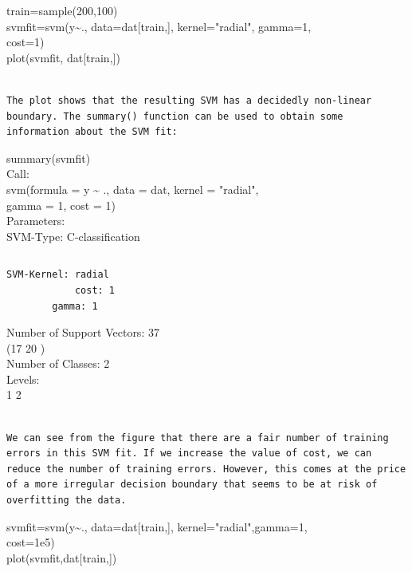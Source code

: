 \documentclass[10pt]{article}
\begin{document}
\begin{displayquote}
train=sample(200,100)\\[0pt]
svmfit=svm(y\~{}., data=dat[train,], kernel="radial", gamma=1,\\
cost=1)\\[0pt]
plot(svmfit, dat[train,])
\end{displayquote}

\begin{verbatim}

The plot shows that the resulting SVM has a decidedly non-linear boundary. The summary() function can be used to obtain some information about the SVM fit:
\end{verbatim}

\begin{displayquote}
summary(svmfit)\\
Call:\\
svm(formula = y \~{} ., data = dat, kernel = "radial",\\
gamma = 1, cost = 1)\\
Parameters:\\
SVM-Type: C-classification
\end{displayquote}

\begin{verbatim}

\end{verbatim}

\begin{verbatim}
SVM-Kernel: radial
            cost: 1
        gamma: 1
\end{verbatim}

Number of Support Vectors: 37\\
(17 20 )\\
Number of Classes: 2\\
Levels:\\
1 2

\begin{verbatim}

We can see from the figure that there are a fair number of training errors in this SVM fit. If we increase the value of cost, we can reduce the number of training errors. However, this comes at the price of a more irregular decision boundary that seems to be at risk of overfitting the data.
\end{verbatim}

\begin{displayquote}
svmfit=svm(y\~{}., data=dat[train,], kernel="radial",gamma=1,\\
cost=1e5)\\[0pt]
plot(svmfit,dat[train,])
\end{displayquote}
\end{document}
